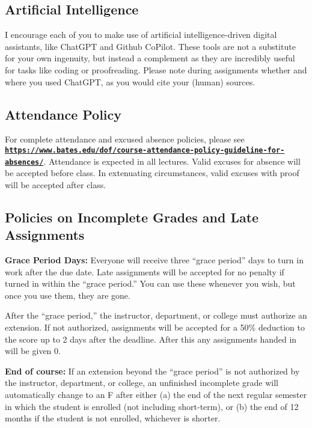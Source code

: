 \documentclass[11pt]{article}
\begin{document}
\subsection*{Artificial Intelligence}
\footnotesize{I encourage each of you to make use of artificial intelligence-driven digital assistants, like ChatGPT and Github CoPilot. These tools are not a substitute for your own ingenuity, but instead a complement as they are incredibly useful for tasks like coding or proofreading. Please note during assignments whether and where you used ChatGPT, as you would cite your (human) sources.}

\subsection*{Attendance Policy}
\footnotesize{For complete attendance and excused absence policies, please see \href{https://www.bates.edu/dof/course-attendance-policy-guideline-for-absences/}{\tt\bf https://www.bates.edu/dof/course-attendance-policy-guideline-for-absences/}. Attendance is expected in all lectures. Valid excuses for absence will be accepted before class. In extenuating circumstances, valid excuses with proof will be accepted after class.}

\subsection*{Policies on Incomplete Grades and Late Assignments}
\footnotesize{\textbf{Grace Period Days:} Everyone will receive three ``grace period'' days to turn in work after the due date. Late assignments will be accepted for no penalty if turned in within the ``grace period.'' You can use these whenever you wish, but once you use them, they are gone.}

\footnotesize{After the ``grace period,'' the instructor, department, or college must authorize an extension. If not authorized, assignments will be accepted for a 50\% deduction to the score up to 2 days after the deadline. After this any assignments handed in will be given 0.}

\footnotesize{\textbf{End of course:} If an extension beyond the ``grace period'' is not authorized by the instructor, department, or college, an unfinished incomplete grade will automatically change to an F after either (a) the end of the next regular semester in which the student is enrolled (not including short-term), or (b) the end of 12 months if the student is not enrolled, whichever is shorter.}
\end{document}
